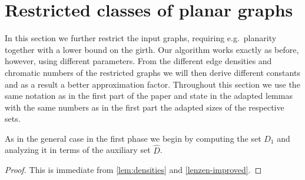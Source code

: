 

\section{Restricted classes of planar graphs}
In this section we further restrict the input graphs, requiring e.g.\ planarity
together with a lower bound on the girth. Our algorithm works exactly as before, however,
using different parameters. From the different edge densities and
chromatic numbers of
the restricted graphs we will then derive different constants and
as a result a better approximation factor. Throughout this section
we use the same notation as in the first part of the paper and state
in the adapted lemmas with the same numbers as in the first part
the adapted sizes of the respective sets.

As in the general case in the first phase we begin by computing
the set $D_1$ and analyzing it in terms of the auxiliary set $\hat{D}$.


\setcounter{lemma}{2}

\begin{proof}
This is immediate from \cref{lem:densities} and \cref{lenzen-improved}.
\end{proof}

